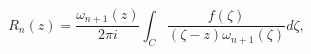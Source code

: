 \[R_{n}(z)=\frac{\omega_{n+1}(z)}{2\pi i}\int_{C}\frac{f(\zeta)}{(\zeta-z)\omega%
_{n+1}(\zeta)}d\zeta,\]